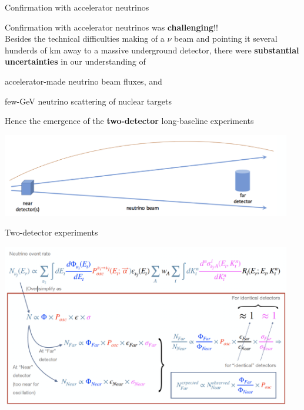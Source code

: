 \begin{frame}[t]{Confirmation with accelerator neutrinos}

Confirmation with accelerator neutrinos was {\bf challenging}!!\\
\vspace{0.2cm}
Besides the technical difficulties making of a $\nu$ beam and pointing it several
hunderds of km away to a massive underground detector, there were
{\bf substantial uncertainties} in our understanding of
\begin{itemize}
{\small
\item accelerator-made neutrino beam fluxes, and
\item few-GeV neutrino scattering of nuclear targets
}
\end{itemize}

Hence the emergence of the {\bf two-detector}
long-baseline experiments\\
\begin{center}
\includegraphics[width=0.95\textwidth]{./images/3nu/accelerator/two_detector.png}\\
\end{center}

\end{frame}

%
%
%

\begin{frame}[t]{Two-detector experiments}

  \begin{center}
  \includegraphics[width=0.95\textwidth]{./images/3nu/accelerator/two_detector_extrapolation_simple.png}\\
  \end{center}

\end{frame}

